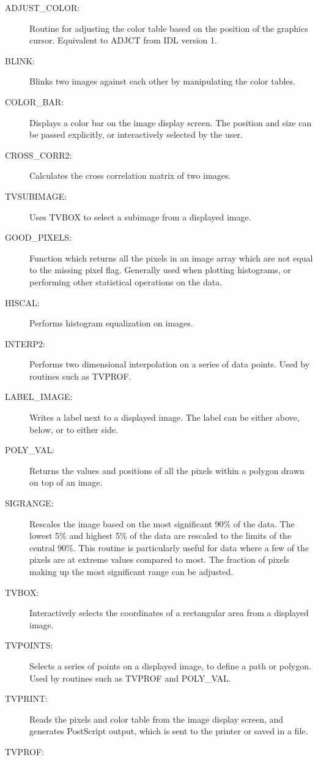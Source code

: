 \begin{description}
\item[ADJUST\_COLOR:]
Routine for adjusting the color table based on the position of the graphics
cursor.  Equivalent to ADJCT from IDL version 1.
\item[BLINK:]
Blinks two images against each other by manipulating the color tables.
\item[COLOR\_BAR:]
Displays a color bar on the image display screen.  The position and size can be
passed explicitly, or interactively selected by the user.
\item[CROSS\_CORR2:]
Calculates the cross correlation matrix of two images.
\item[TVSUBIMAGE:]
Uses TVBOX to select a subimage from a displayed image.
\item[GOOD\_PIXELS:]
Function which returns all the pixels in an image array which are not equal to
the missing pixel flag.  Generally used when plotting histograms, or performing
other statistical operations on the data.
\item[HISCAL:]
Performs histogram equalization on images.
\item[INTERP2:]
Performs two dimensional interpolation on a series of data points.  Used by
routines such as TVPROF.
\item[LABEL\_IMAGE:]
Writes a label next to a displayed image.  The label can be either above,
below, or to either side.
\item[POLY\_VAL:]
Returns the values and positions of all the pixels within a polygon drawn on
top of an image.
\item[SIGRANGE:]
Rescales the image based on the most significant 90\% of the data.  The lowest
5\% and highest 5\% of the data are rescaled to the limits of the central 90\%.
This routine is particularly useful for data where a few of the pixels are at
extreme values compared to most.  The fraction of pixels making up the most
significant range can be adjusted.
\item[TVBOX:]
Interactively selects the coordinates of a rectangular area from a displayed
image.
\item[TVPOINTS:]
Selects a series of points on a displayed image, to define a path or polygon.
Used by routines such as TVPROF and POLY\_VAL.
\item[TVPRINT:]
Reads the pixels and color table from the image display screen, and generates
PostScript output, which is sent to the printer or saved in a file.
\item[TVPROF:]

\end{description}
